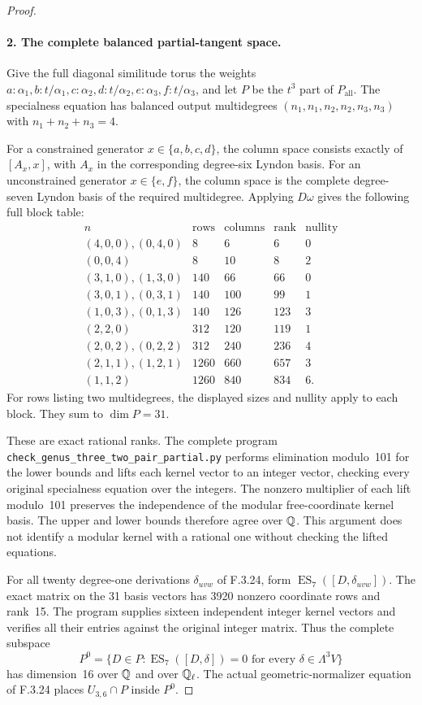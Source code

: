 \begin{proof}
\paragraph{2. The complete balanced partial-tangent space.}
Give the full diagonal similitude torus the weights
$a:\alpha_1,b:t/\alpha_1,c:\alpha_2,d:t/\alpha_2,
e:\alpha_3,f:t/\alpha_3$, and let $P$ be the
$t^3$ part of $P_{\mathrm{all}}$.
The specialness equation has balanced output
multidegrees $(n_1,n_1,n_2,n_2,n_3,n_3)$ with
$n_1+n_2+n_3=4$.

For a constrained generator $x\in\{a,b,c,d\}$,
the column space consists exactly of
$[A_x,x]$, with $A_x$ in the corresponding
degree-six Lyndon basis. For an unconstrained
generator $x\in\{e,f\}$, the column space
is the complete degree-seven Lyndon basis
of the required multidegree. Applying
$D\omega$ gives the following full block table:
\[
\begin{array}{c|r|r|r|r}
n&\text{rows}&\text{columns}&\text{rank}&\text{nullity}\\\hline
(4,0,0),(0,4,0)&8&6&6&0\\
(0,0,4)&8&10&8&2\\
(3,1,0),(1,3,0)&140&66&66&0\\
(3,0,1),(0,3,1)&140&100&99&1\\
(1,0,3),(0,1,3)&140&126&123&3\\
(2,2,0)&312&120&119&1\\
(2,0,2),(0,2,2)&312&240&236&4\\
(2,1,1),(1,2,1)&1260&660&657&3\\
(1,1,2)&1260&840&834&6.
\end{array}                                               \tag{PT.4}
\]
For rows listing two multidegrees, the displayed
sizes and nullity apply to each block. They sum
to $\dim P=31$.

These are exact rational ranks. The complete
program \texttt{check\_genus\_three\_two\_pair\_}\allowbreak\texttt{partial.py}
performs elimination modulo~101 for the lower
bounds and lifts each kernel vector to an
integer vector, checking every original
specialness equation over the integers.
The nonzero multiplier of each lift modulo~101
preserves the independence of the modular
free-coordinate kernel basis. The upper and
lower bounds therefore agree over $\mathbb Q$.
This argument does not identify a modular
kernel with a rational one without checking
the lifted equations.

For all twenty degree-one derivations
$\delta_{uvw}$ of F.3.24, form
$\operatorname{ES}_7([D,\delta_{uvw}])$.
The exact matrix on the 31 basis vectors has
3920 nonzero coordinate rows and rank~15.
The program supplies sixteen independent
integer kernel vectors and verifies all their
entries against the original integer matrix.
Thus the complete subspace
\[
 P^0=\{D\in P:\operatorname{ES}_7([D,\delta])=0
                      \text{ for every }\delta\in\Lambda^3V\}
\]
has dimension~16 over $\mathbb Q$ and over $\mathbb Q_\ell$.
The actual geometric-normalizer equation of
F.3.24 places $U_{3,6}\cap P$ inside $P^0$.


\end{proof}
